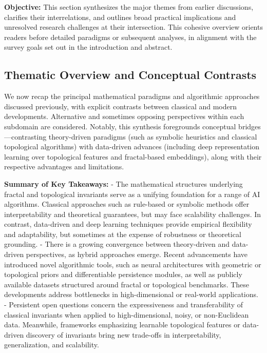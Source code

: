 \documentclass[sigconf]{acmart}
\begin{document}
\textbf{Objective:} This section synthesizes the major themes from earlier discussions, clarifies their interrelations, and outlines broad practical implications and unresolved research challenges at their intersection. This cohesive overview orients readers before detailed paradigms or subsequent analyses, in alignment with the survey goals set out in the introduction and abstract.

\subsection*{Thematic Overview and Conceptual Contrasts}
We now recap the principal mathematical paradigms and algorithmic approaches discussed previously, with explicit contrasts between classical and modern developments. Alternative and sometimes opposing perspectives within each subdomain are considered. Notably, this synthesis foregrounds conceptual bridges—contrasting theory-driven paradigms (such as symbolic heuristics and classical topological algorithms) with data-driven advances (including deep representation learning over topological features and fractal-based embeddings), along with their respective advantages and limitations.

\vspace{0.5em}

\textbf{Summary of Key Takeaways:}
- The mathematical structures underlying fractal and topological invariants serve as a unifying foundation for a range of AI algorithms. Classical approaches such as rule-based or symbolic methods offer interpretability and theoretical guarantees, but may face scalability challenges. In contrast, data-driven and deep learning techniques provide empirical flexibility and adaptability, but sometimes at the expense of robustness or theoretical grounding.
- There is a growing convergence between theory-driven and data-driven perspectives, as hybrid approaches emerge. Recent advancements have introduced novel algorithmic tools, such as neural architectures with geometric or topological priors and differentiable persistence modules, as well as publicly available datasets structured around fractal or topological benchmarks. These developments address bottlenecks in high-dimensional or real-world applications.
- Persistent open questions concern the expressiveness and transferability of classical invariants when applied to high-dimensional, noisy, or non-Euclidean data. Meanwhile, frameworks emphasizing learnable topological features or data-driven discovery of invariants bring new trade-offs in interpretability, generalization, and scalability.
\end{document}
